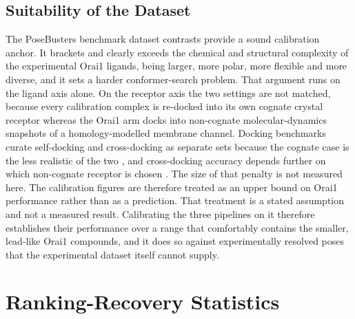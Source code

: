 \hypertarget{suitability-of-the-dataset}{%
\section{Suitability of the Dataset}\label{suitability-of-the-dataset}}

The PoseBusters benchmark dataset contrasts provide a sound calibration anchor. It brackets and clearly exceeds the chemical and structural complexity of the experimental Orai1 ligands, being larger, more polar, more flexible and more diverse, and it sets a harder conformer-search problem. That argument runs on the ligand axis alone. On the receptor axis the two settings are not matched, because every calibration complex is re-docked into its own cognate crystal receptor whereas the Orai1 arm docks into non-cognate molecular-dynamics snapshots of a homology-modelled membrane channel. Docking benchmarks curate self-docking and cross-docking as separate sets because the cognate case is the less realistic of the two \cite{ref012}, and cross-docking accuracy depends further on which non-cognate receptor is chosen \cite{ref033}. The size of that penalty is not measured here. The calibration figures are therefore treated as an upper bound on Orai1 performance rather than as a prediction. That treatment is a stated assumption and not a measured result. Calibrating the three pipelines on it therefore establishes their performance over a range that comfortably contains the smaller, lead-like Orai1 compounds, and it does so against experimentally resolved poses that the experimental dataset itself cannot supply.

\hypertarget{ranking-recovery-statistics}{%
\chapter{Ranking-Recovery Statistics}\label{ranking-recovery-statistics}}

